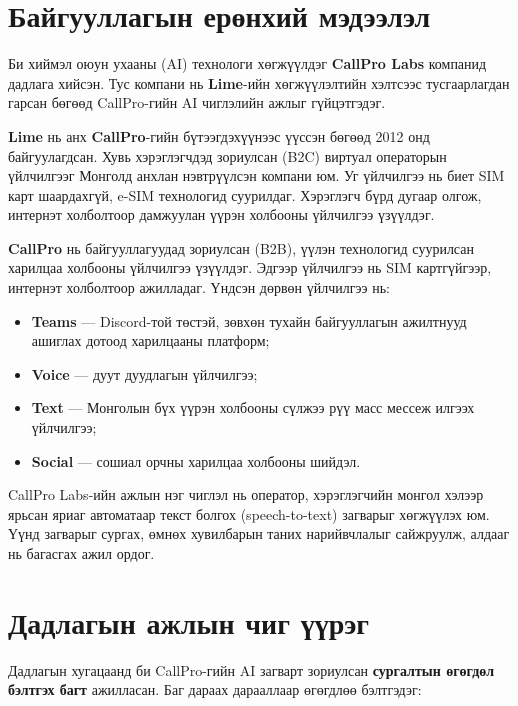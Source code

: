 \documentclass[../main.tex]{subfiles}
\begin{document}
\section{Байгууллагын ерөнхий мэдээлэл}

Би хиймэл оюун ухааны (AI) технологи хөгжүүлдэг \textbf{CallPro Labs}
компанид дадлага хийсэн. Тус компани нь \textbf{Lime}-ийн хөгжүүлэлтийн
хэлтсээс тусгаарлагдан гарсан бөгөөд CallPro-гийн AI чиглэлийн ажлыг
гүйцэтгэдэг.

\textbf{Lime} нь анх \textbf{CallPro}-гийн бүтээгдэхүүнээс үүссэн бөгөөд
2012 онд байгуулагдсан. Хувь хэрэглэгчдэд зориулсан (B2C) виртуал операторын
үйлчилгээг Монголд анхлан нэвтрүүлсэн компани юм. Уг үйлчилгээ нь биет SIM
карт шаардахгүй, e-SIM технологид суурилдаг. Хэрэглэгч бүрд дугаар олгож,
интернэт холболтоор дамжуулан үүрэн холбооны үйлчилгээ үзүүлдэг.

\textbf{CallPro} нь байгууллагуудад зориулсан (B2B), үүлэн технологид
суурилсан харилцаа холбооны үйлчилгээ үзүүлдэг. Эдгээр үйлчилгээ нь SIM
картгүйгээр, интернэт холболтоор ажилладаг. Үндсэн дөрвөн үйлчилгээ нь:

\begin{itemize}
  \item \textbf{Teams} --- Discord-той төстэй, зөвхөн тухайн байгууллагын
  ажилтнууд ашиглах дотоод харилцааны платформ;
  \item \textbf{Voice} --- дуут дуудлагын үйлчилгээ;
  \item \textbf{Text} --- Монголын бүх үүрэн холбооны сүлжээ рүү масс мессеж
  илгээх үйлчилгээ;
  \item \textbf{Social} --- сошиал орчны харилцаа холбооны шийдэл.
\end{itemize}

CallPro Labs-ийн ажлын нэг чиглэл нь оператор, хэрэглэгчийн монгол хэлээр
ярьсан яриаг автоматаар текст болгох (speech-to-text) загварыг хөгжүүлэх
юм. Үүнд загварыг сургах, өмнөх хувилбарын таних нарийвчлалыг сайжруулж,
алдааг нь багасгах ажил ордог.

\section{Дадлагын ажлын чиг үүрэг}

Дадлагын хугацаанд би CallPro-гийн AI загварт зориулсан \textbf{сургалтын
өгөгдөл бэлтгэх багт} ажилласан. Баг дараах дарааллаар өгөгдлөө бэлтгэдэг:
\end{document}
